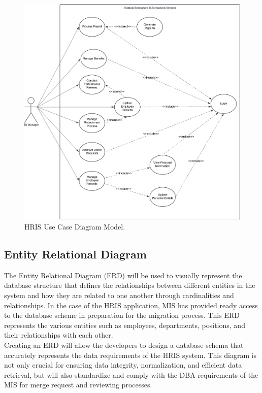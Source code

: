     \begin{figure}[H]
        \centering
        \includegraphics[width=1\linewidth]{figures/fig-6.png}
        \caption{HRIS Use Case Diagram Model.}
        \label{fig:enter-label}
    \end{figure}
    
    \subsection{Entity Relational Diagram}
    
    The Entity Relational Diagram (ERD) will be used to visually represent the database structure that defines the relationships between different entities in the system and how they are related to one another through cardinalities and relationships. In the case of the HRIS application, MIS has provided ready access to the database scheme in preparation for the migration process. This ERD represents the various entities such as employees, departments, positions, and their relationships with each other. 
    \\
    
    Creating an ERD will allow the developers to design a database schema that accurately represents the data requirements of the HRIS system. This diagram is not only crucial for ensuring data integrity, normalization, and efficient data retrieval, but will also standardize and comply with the DBA requirements of the MIS for merge request and reviewing processes.

